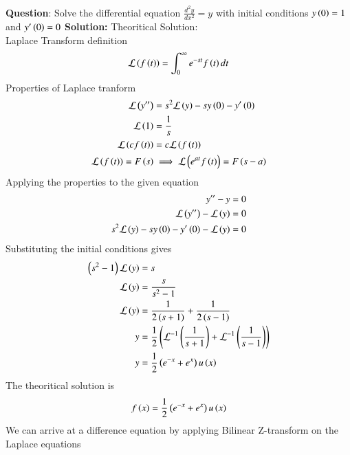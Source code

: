 \documentclass[journal]{IEEEtran}
\begin{document}
\textbf{Question}:\newline
Solve the differential equation $\frac{d^2y}{dx^2} = y$ with initial conditions $y\left(0\right) = 1$ and $y^{\prime}\left(0\right) = 0$
\newline
\textbf{Solution: }
\newline
Theoritical Solution:\\
Laplace Transform definition\\
\begin{align}
	\mathcal{L}\left(f\left(t\right)\right) = \int_{0}^{\infty}e^{-st}f\left(t\right)dt
\end{align}
Properties of Laplace tranform
\begin{align}
	\mathcal{L}\left(y^{\prime\prime}\right) &= s^2\mathcal{L}\left(y\right) -sy\left(0\right)-y^\prime\left(0\right)\\
	\mathcal{L}\left(1\right) &= \frac{1}{s}\\
	\mathcal{L}\left(cf\left(t\right)\right) &= c\mathcal{L}\left(f\left(t\right)\right)\\
	\mathcal{L}\left(f\left(t\right)\right) = F\left(s\right) &\implies \mathcal{L}\left(e^{at}f\left(t\right)\right) = F\left(s-a\right)
\end{align}
Applying the properties to the given equation
\begin{align}
	y^{\prime\prime} - y &= 0\\
	\mathcal{L}\left(y^{\prime\prime}\right) - \mathcal{L}\left(y\right) &= 0\\
	s^2\mathcal{L}\left(y\right) -sy\left(0\right)-y^\prime\left(0\right)-\mathcal{L}\left(y\right) &= 0\\
\end{align}
Substituting the initial conditions gives
\begin{align}
	\left(s^2-1\right)\mathcal{L}\left(y\right)&= s\\
	\mathcal{L}\left(y\right) &= \frac{s}{s^2 - 1}\\
	 \mathcal{L}\left(y\right) &= \frac{1}{2\left(s+1\right)}+\frac{1}{2\left(s-1\right)}\\
	y &= \frac{1}{2}\left(\mathcal{L}^{-1}\left(\frac{1}{s+1}\right)+\mathcal{L}^{-1}\left(\frac{1}{s-1}\right)\right)\\
	y &= \frac{1}{2}\left(e^{-x}+e^{x}\right)u\left(x\right)
\end{align}
The theoritical solution is 
\begin{align}
	f\left(x\right) = \frac{1}{2}\left(e^{-x}+e^{x}\right)u\left(x\right)
\end{align}
We can arrive at a difference equation by applying Bilinear Z-transform on the Laplace equations
\end{document}
